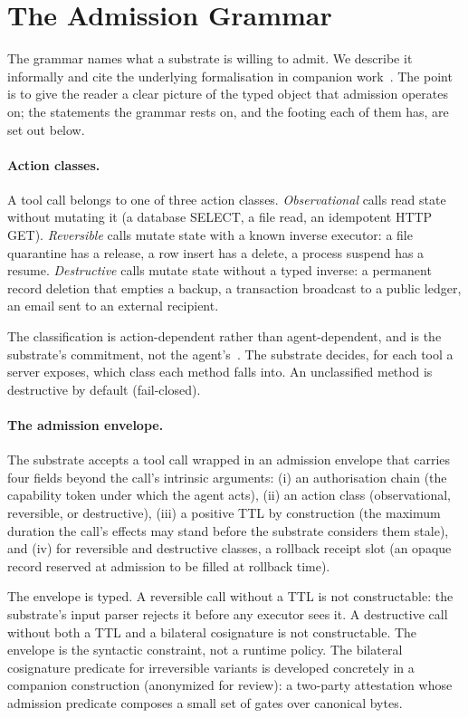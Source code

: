 \section{The Admission Grammar}
\label{sec:grammar}

The grammar names what a substrate is willing to admit. We describe it informally and cite the underlying formalisation in companion work~\cite{programmableSovereignty2026}. The point is to give the reader a clear picture of the typed object that admission operates on; the statements the grammar rests on, and the footing each of them has, are set out below.

\paragraph{Action classes.}
A tool call belongs to one of three action classes. \emph{Observational} calls read state without mutating it (a database SELECT, a file read, an idempotent HTTP GET). \emph{Reversible} calls mutate state with a known inverse executor: a file quarantine has a release, a row insert has a delete, a process suspend has a resume. \emph{Destructive} calls mutate state without a typed inverse: a permanent record deletion that empties a backup, a transaction broadcast to a public ledger, an email sent to an external recipient.

The classification is action-dependent rather than agent-dependent, and is the substrate's commitment, not the agent's~\cite{programmableSovereignty2026}. The substrate decides, for each tool a server exposes, which class each method falls into. An unclassified method is destructive by default (fail-closed).

\paragraph{The admission envelope.}
The substrate accepts a tool call wrapped in an admission envelope that carries four fields beyond the call's intrinsic arguments: (i) an authorisation chain (the capability token under which the agent acts), (ii) an action class (observational, reversible, or destructive), (iii) a positive TTL by construction (the maximum duration the call's effects may stand before the substrate considers them stale), and (iv) for reversible and destructive classes, a rollback receipt slot (an opaque record reserved at admission to be filled at rollback time).

The envelope is typed. A reversible call without a TTL is not constructable: the substrate's input parser rejects it before any executor sees it. A destructive call without both a TTL and a bilateral cosignature is not constructable. The envelope is the syntactic constraint, not a runtime policy. The bilateral cosignature predicate for irreversible variants is developed concretely in a companion construction (anonymized for review): a two-party attestation whose admission predicate composes a small set of gates over canonical bytes.

